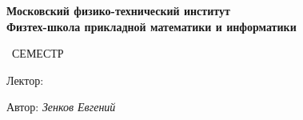 \begin{titlepage}
	\clearpage\thispagestyle{empty}
	\centering
	
	\textbf{Московский физико-технический институт \\ Физтех-школа прикладной математики и информатики}
	\vspace{33ex}
	
	{\textbf{\FullCourseNameFirstPart}}
 
        {\textbf{}}
	
	\SemesterNumber\ СЕМЕСТР  
	\vspace{1ex}
	
	Лектор: \textit{\LecturerInitials}

        Автор: \textit{Зенков Евгений}

        \vfill
	\CourseDate
	\pagebreak
\end{titlepage}
